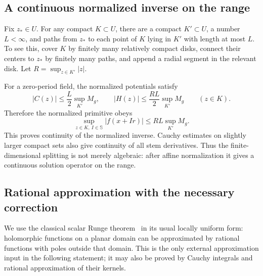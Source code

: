 \documentclass[11pt,a4paper]{article}
\numberwithin{equation}{section}
\theoremstyle{definition}
\theoremstyle{remark}
\newcommand{\Sph}{\mathbb S}
\begin{document}
\subsection{A continuous normalized inverse on the range}
Fix $z_*\in U$. For any compact $K\subset U$, there are a compact
$K'\subset U$, a number $L<\infty$, and paths from $z_*$ to each point
of $K$ lying in $K'$ with length at most $L$. To see this, cover $K$ by
finitely many relatively compact disks, connect their centers to $z_*$
by finitely many paths, and append a radial segment in the relevant disk.
Let $R=\sup_{z\in K'}|z|$.

For a zero-period field, the normalized potentials satisfy
\[
 |C(z)|\le\frac L2\sup_{K'}M_g,\qquad
 |H(z)|\le\frac{RL}{2}\sup_{K'}M_g\qquad(z\in K).
\]
Therefore the normalized primitive obeys
\begin{equation}
 \sup_{z\in K,\ I\in\Sph}|f(x+Ir)|
 \le RL\sup_{K'}M_g.
 \label{eq:inverse-bound}
\end{equation}
This proves continuity of the normalized inverse. Cauchy estimates on
slightly larger compact sets also give continuity of all stem
derivatives. Thus the finite-dimensional splitting is not merely
algebraic: after affine normalization it gives a continuous solution
operator on the range.

\subsection{Rational approximation with the necessary correction}
We use the classical scalar Runge theorem~\cite{Runge} in its usual locally uniform
form: holomorphic functions on a planar domain can be approximated by
rational functions with poles outside that domain. This is the only
external approximation input in the following statement; it may also
be proved by Cauchy integrals and rational approximation of their kernels.
\end{document}
